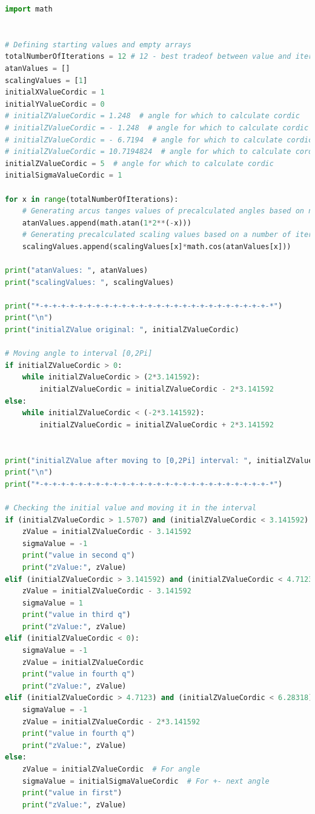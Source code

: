 \documentclass[a4paper, twoside, 11pt]{article}
\begin{document}
\begin{lstlisting}[language={python}, caption={Python code of \gls{abbreviation:cordic} implementation.}, label= {lst:python-cordic}]
import math


# Defining starting values and empty arrays
totalNumberOfIterations = 12 # 12 - best tradeof between value and iterations
atanValues = []
scalingValues = [1]
initialXValueCordic = 1
initialYValueCordic = 0
# initialZValueCordic = 1.248  # angle for which to calculate cordic
# initialZValueCordic = - 1.248  # angle for which to calculate cordic
# initialZValueCordic = - 6.7194  # angle for which to calculate cordic
# initialZValueCordic = 10.7194824  # angle for which to calculate cordic
initialZValueCordic = 5  # angle for which to calculate cordic
initialSigmaValueCordic = 1

for x in range(totalNumberOfIterations):
    # Generating arcus tanges values of precalculated angles based on number of iterations
    atanValues.append(math.atan(1*2**(-x)))
    # Generating precalculated scaling values based on a number of iterations
    scalingValues.append(scalingValues[x]*math.cos(atanValues[x]))

print("atanValues: ", atanValues)
print("scalingValues: ", scalingValues)

print("*-+-+-+-+-+-+-+-+-+-+-+-+-+-+-+-+-+-+-+-+-+-+-+-+-+-+-*")
print("\n")
print("initialZValue original: ", initialZValueCordic)

# Moving angle to interval [0,2Pi]
if initialZValueCordic > 0:
    while initialZValueCordic > (2*3.141592):
        initialZValueCordic = initialZValueCordic - 2*3.141592
else:
    while initialZValueCordic < (-2*3.141592):
        initialZValueCordic = initialZValueCordic + 2*3.141592


print("initialZValue after moving to [0,2Pi] interval: ", initialZValueCordic)
print("\n")
print("*-+-+-+-+-+-+-+-+-+-+-+-+-+-+-+-+-+-+-+-+-+-+-+-+-+-+-*")

# Checking the initial value and moving it in the interval
if (initialZValueCordic > 1.5707) and (initialZValueCordic < 3.141592):
    zValue = initialZValueCordic - 3.141592
    sigmaValue = -1
    print("value in second q")
    print("zValue:", zValue)
elif (initialZValueCordic > 3.141592) and (initialZValueCordic < 4.7123):
    zValue = initialZValueCordic - 3.141592
    sigmaValue = 1
    print("value in third q")
    print("zValue:", zValue)
elif (initialZValueCordic < 0):
    sigmaValue = -1
    zValue = initialZValueCordic
    print("value in fourth q")
    print("zValue:", zValue)
elif (initialZValueCordic > 4.7123) and (initialZValueCordic < 6.28318):
    sigmaValue = -1
    zValue = initialZValueCordic - 2*3.141592
    print("value in fourth q")
    print("zValue:", zValue)
else:
    zValue = initialZValueCordic  # For angle
    sigmaValue = initialSigmaValueCordic  # For +- next angle
    print("value in first")
    print("zValue:", zValue)


\end{lstlisting}
\end{document}
